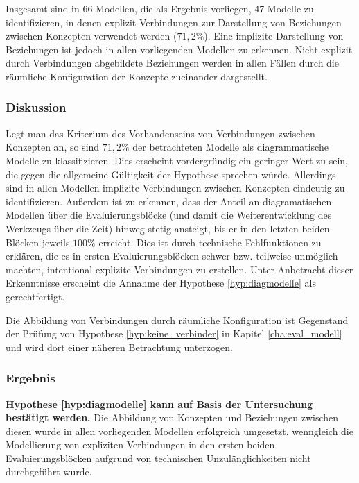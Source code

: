 Insgesamt sind in 66 Modellen, die als Ergebnis vorliegen, 47 Modelle zu identifizieren, in denen explizit Verbindungen zur Darstellung von Beziehungen zwischen Konzepten verwendet werden ($71,2\%$). Eine implizite Darstellung von Beziehungen ist jedoch in allen vorliegenden Modellen zu erkennen. Nicht explizit durch Verbindungen abgebildete Beziehungen werden in allen Fällen durch die räumliche Konfiguration der Konzepte zueinander dargestellt.

\subsubsection{Diskussion} %

Legt man das Kriterium des Vorhandenseins von Verbindungen zwischen Konzepten an, so sind $71,2\%$ der betrachteten Modelle als diagrammatische Modelle zu klassifizieren. Dies erscheint vordergründig ein geringer Wert zu sein, die gegen die allgemeine Gültigkeit der Hypothese sprechen würde. Allerdings sind in allen Modellen implizite Verbindungen zwischen Konzepten eindeutig zu identifizieren. Außerdem ist zu erkennen, dass der Anteil an diagramatischen Modellen über die Evaluierungsblöcke (und damit die Weiterentwicklung des Werkzeugs über die Zeit) hinweg stetig ansteigt, bis er in den letzten beiden Blöcken jeweils $100\%$ erreicht. Dies ist durch technische Fehlfunktionen zu erklären, die es in ersten Evaluierungsblöcken schwer bzw. teilweise unmöglich machten, intentional explizite Verbindungen zu erstellen. Unter Anbetracht dieser Erkenntnisse erscheint die Annahme der Hypothese \ref{hyp:diagmodelle} als gerechtfertigt.

Die Abbildung von Verbindungen durch räumliche Konfiguration ist Gegenstand der Prüfung von Hypothese \ref{hyp:keine_verbinder} in Kapitel \ref{cha:eval_modell} und wird dort einer näheren Betrachtung unterzogen.

\subsubsection{Ergebnis} %

\textbf{Hypothese \ref{hyp:diagmodelle} kann auf Basis der Untersuchung bestätigt werden.} Die Abbildung von Konzepten und Beziehungen zwischen diesen wurde in allen vorliegenden Modellen erfolgreich umgesetzt, wenngleich die Modellierung von expliziten Verbindungen in den ersten beiden Evaluierungsblöcken aufgrund von technischen Unzulänglichkeiten nicht durchgeführt wurde.

